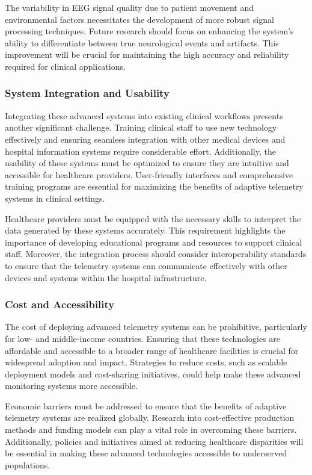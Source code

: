 \documentclass[12pt,journal,compsoc]{IEEEtran}
\begin{document}
The variability in EEG signal quality due to patient movement and environmental factors necessitates the development of more robust signal processing techniques. Future research should focus on enhancing the system's ability to differentiate between true neurological events and artifacts. This improvement will be crucial for maintaining the high accuracy and reliability required for clinical applications.

\subsubsection{System Integration and Usability}

Integrating these advanced systems into existing clinical workflows presents another significant challenge. Training clinical staff to use new technology effectively and ensuring seamless integration with other medical devices and hospital information systems require considerable effort. Additionally, the usability of these systems must be optimized to ensure they are intuitive and accessible for healthcare providers. User-friendly interfaces and comprehensive training programs are essential for maximizing the benefits of adaptive telemetry systems in clinical settings.

Healthcare providers must be equipped with the necessary skills to interpret the data generated by these systems accurately. This requirement highlights the importance of developing educational programs and resources to support clinical staff. Moreover, the integration process should consider interoperability standards to ensure that the telemetry systems can communicate effectively with other devices and systems within the hospital infrastructure.

\subsubsection{Cost and Accessibility}

The cost of deploying advanced telemetry systems can be prohibitive, particularly for low- and middle-income countries. Ensuring that these technologies are affordable and accessible to a broader range of healthcare facilities is crucial for widespread adoption and impact. Strategies to reduce costs, such as scalable deployment models and cost-sharing initiatives, could help make these advanced monitoring systems more accessible.

Economic barriers must be addressed to ensure that the benefits of adaptive telemetry systems are realized globally. Research into cost-effective production methods and funding models can play a vital role in overcoming these barriers. Additionally, policies and initiatives aimed at reducing healthcare disparities will be essential in making these advanced technologies accessible to underserved populations.
\end{document}
